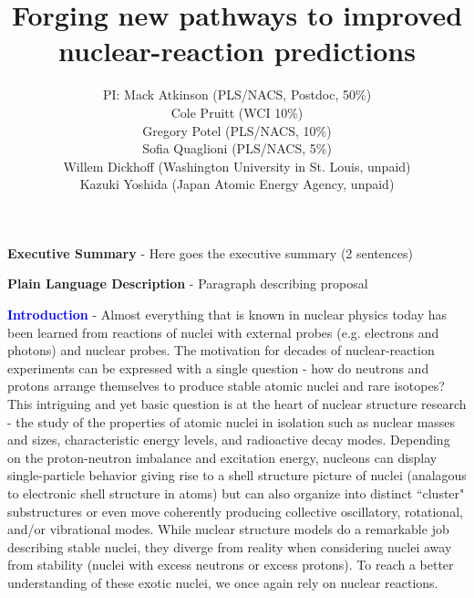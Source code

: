 \documentclass[12pt]{article}
\begin{document}
\title{Forging new pathways to improved nuclear-reaction predictions}
\author{PI: Mack Atkinson (PLS/NACS, Postdoc, 50\%) \\
Cole Pruitt (WCI 10\%) \\
Gregory Potel (PLS/NACS, 10\%) \\
Sofia Quaglioni (PLS/NACS, 5\%) \\
Willem Dickhoff (Washington University in St. Louis, unpaid) \\
Kazuki Yoshida (Japan Atomic Energy Agency, unpaid)
}
\maketitle


\vspace{4cm}
\textbf{Executive Summary} - Here goes the executive summary (2 sentences)

\vspace{2cm}
\textbf{Plain Language Description} - Paragraph describing proposal

\newpage

\textcolor{blue}{\textbf{Introduction}}
 - Almost everything that is known in nuclear physics today has been learned from reactions of nuclei with external probes (e.g.
 electrons and photons) and nuclear probes. The motivation for decades of nuclear-reaction experiments can be expressed
 with a single question - how do neutrons and protons arrange themselves to produce stable atomic nuclei and rare
 isotopes? This intriguing and yet basic question is at the heart of nuclear structure research - the study of the
 properties of atomic nuclei in isolation such as nuclear masses and sizes, characteristic energy levels, and
 radioactive decay modes.
Depending on the proton-neutron imbalance and excitation energy, nucleons can display single-particle behavior giving
rise to a shell structure picture of nuclei (analagous to electronic shell structure in atoms) but can also organize
into distinct ``cluster" substructures or even move coherently producing collective oscillatory, rotational, and/or
vibrational modes.
While nuclear structure models do a remarkable job describing stable nuclei, they diverge from reality when considering nuclei
away from stability (nuclei with excess neutrons or excess protons). To reach a better understanding of these
exotic nuclei, we once again rely on nuclear reactions.
\end{document}
